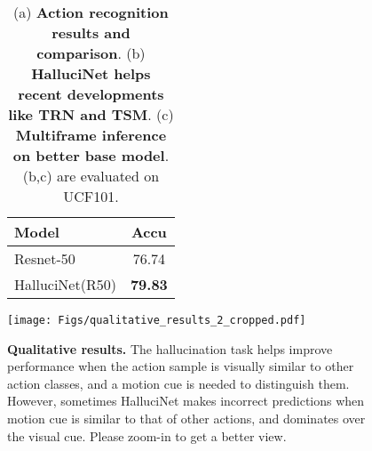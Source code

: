 \documentclass[10pt,twocolumn,letterpaper]{article}
\begin{document}
\begin{table}
\begin{subfigure}[t]{0.45\columnwidth}
\end{subfigure}
\hfill
\begin{subfigure}[t]{0.45\columnwidth}
\small
\centering
\begin{tabular}{@{}lc@{}}
\toprule
\textbf{Model}             & \textbf{Accu} \\ \midrule
Resnet-50             & 76.74             \\
HalluciNet(R50) & \textbf{79.83}    \\ \bottomrule
\end{tabular}
\caption{}
\label{tab:resnet-50}
\end{subfigure}
\caption{(a) \textbf{Action recognition results and comparison}. (b) \textbf{HalluciNet helps recent developments like TRN and TSM}. (c) \textbf{Multiframe inference on better base model}. (b,c) are evaluated on UCF101.}
\end{table} \begin{figure}
\centering
\texttt{[image: Figs/qualitative\_results\_2\_cropped.pdf]}
\caption{\textbf{Qualitative results.} The hallucination task helps improve performance when the action sample is visually similar to other action classes, and a motion cue is needed to distinguish them. However, sometimes HalluciNet makes incorrect predictions when motion cue is similar to that of other actions, and dominates over the visual cue. Please zoom-in to get a better view.}
\label{qualitative_results}
\end{figure}
\end{document}

